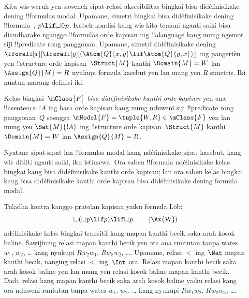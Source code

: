 \documentclass[../../../include/open-logic-section]{subfiles}
\begin{document}


Kita wis weruh yen saweneh sipat relasi aksesibilitas bingkai
bisa didéfinisikake dening !!{formula}s modal. Upamane, simetri
bingkai bisa didéfinisikake dening !!{formula}~, $p \lif
\Box\Diamond p$. Kabeh kondisi kang wis kita temoni nganti saiki
bisa diandharake nganggo !!{formula}s orde kapisan ing !!a{language}
kang mung ngemot siji !!{predicate} rong panggonan. Upamane, simetri
didéfinisikake dening
$\lforall[x][\lforall[y][(\Atom{Q}{x,y} \lif \Atom{Q}{y, x})]]$
ing pangertèn yen !!{structure} orde kapisan~$\Struct{M}$ kanthi
$\Domain{M} = W$ lan $\Assign{Q}{M} = R$ nyukupi formula kasebut yen
lan mung yen $R$ simetris. Iki nuntun marang definisi iki:

\begin{defn}
  Kelas bingkai~$\mClass{F}$ \emph{bisa didéfinisikake kanthi orde
    kapisan} yen ana !!a{sentence}~$!A$ ing basa orde kapisan kang mung
  nduweni siji !!{predicate} rong panggonan~$Q$ saengga $\mModel{F} =
  \tuple{W, R} \in \mClass{F}$ yen lan mung yen $\Sat{M}{!A}$ ing
  !!{structure} orde kapisan~$\Struct{M}$ kanthi $\Domain{M} = W$ lan
  $\Assign{Q}{M} = R$.
\end{defn}

Nyatane sipat-sipat lan !!{formula}s modal kang
ndéfinisikake sipat kasebut, kang wis ditliti nganti saiki, iku
istimewa. Ora saben !!{formula} ndéfinisikake kelas bingkai kang bisa
didéfinisikake kanthi orde kapisan; lan ora saben kelas bingkai kang
bisa didéfinisikake kanthi orde kapisan bisa didéfinisikake dening
formula modal.

Tuladha kontra kanggo pratelan kapisan yaiku formula L\"ob:
\begin{equation}
\Box(\Box p \lif p) \lif \Box p. \tag{\Ax{W}}
\end{equation}
 ndéfinisikake kelas bingkai transitif kang mapan kanthi becik
saka arah kosok baline. Sawijining relasi mapan kanthi becik yen ora
ana runtutan tanpa wates
$w_1$, $w_2$, \dots{} kang nyukupi $Rw_2w_1$, $Rw_3w_2$, \dots.
Upamane, relasi $<$ ing~$\Nat$ mapan kanthi becik, nanging relasi
$<$ ing~$\Int$ ora. Relasi mapan kanthi becik saka arah kosok baline
yen lan mung yen relasi kosok baline mapan kanthi becik. Dadi, relasi
kang mapan kanthi becik saka arah kosok baline yaiku relasi kang ora
nduweni runtutan tanpa wates $w_1$, $w_2$, \dots{} kang nyukupi
$Rw_1w_2$, $Rw_2w_3$, \dots.
\end{document}
